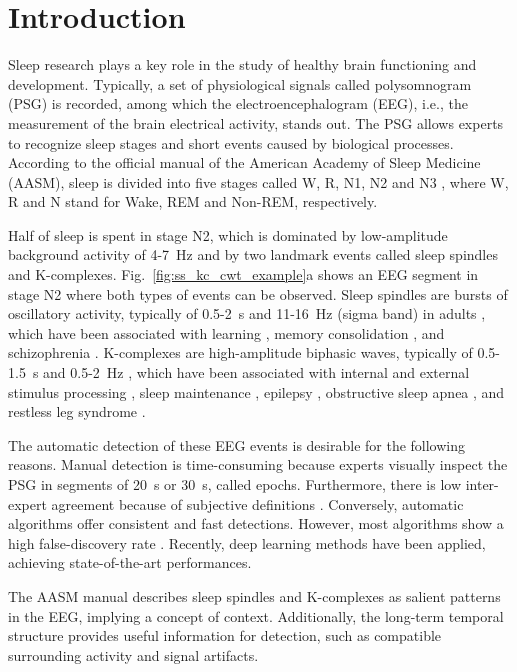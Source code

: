 \documentclass[conference]{IEEEtran}
\begin{document}
\section{Introduction}


Sleep research plays a key role in the study of healthy brain functioning and development. Typically, a set of physiological signals called polysomnogram (PSG) is recorded, among which the electroencephalogram (EEG), i.e., the measurement of the brain electrical activity, stands out. The PSG allows experts to recognize sleep stages and short events caused by biological processes. According to the official manual of the American Academy of Sleep Medicine (AASM), sleep is divided into five stages called W, R, N1, N2 and N3 \cite{berry2012aasm}, where W, R and N stand for Wake, REM and Non-REM, respectively. 

Half of sleep is spent in stage N2, which is dominated by low-amplitude background activity of 4-7~Hz and by two landmark events called sleep spindles and K-complexes. Fig.~\ref{fig:ss_kc_cwt_example}a shows an EEG segment in stage N2 where both types of events can be observed. Sleep spindles are bursts of oscillatory activity, typically of 0.5-2~s and 11-16~Hz (sigma band) in adults \cite{berry2012aasm}, which have been associated with learning \cite{coppieters2016sleep}, memory consolidation \cite{coppieters2016sleep}, and schizophrenia \cite{clawson2016form}. K-complexes are high-amplitude biphasic waves, typically of 0.5-1.5~s and 0.5-2~Hz \cite{berry2012aasm}, which have been associated with internal and external stimulus processing \cite{wauquier1995k}, sleep maintenance \cite{wauquier1995k}, epilepsy \cite{el2008k}, obstructive sleep apnea \cite{guilleminault1976sleep}, and restless leg syndrome \cite{glasauer2001restless}.

The automatic detection of these EEG events is desirable for the following reasons. Manual detection is time-consuming because experts visually inspect the PSG in segments of 20~s or 30~s, called epochs. Furthermore, there is low inter-expert agreement because of subjective definitions \cite{warby2014sleep}. Conversely, automatic algorithms offer consistent and fast detections. However, most algorithms show a high false-discovery rate \cite{coppieters2016sleep}. Recently, deep learning methods \cite{chambon2019dosed, kulkarni2019deep} have been applied, achieving state-of-the-art performances. 

The AASM manual describes sleep spindles and K-complexes as salient patterns in the EEG, implying a concept of context. Additionally, the long-term temporal structure provides useful information for detection, such as compatible surrounding activity and signal artifacts. 
\end{document}
